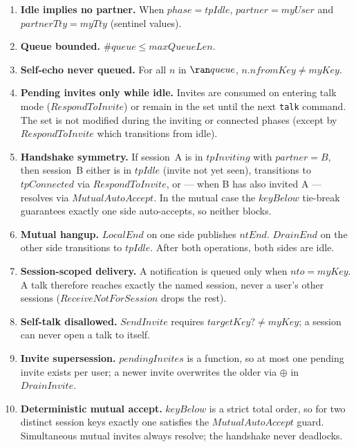 \documentclass[a4paper,10pt,fleqn]{article}
\begin{document}
\begin{enumerate}
\item \textbf{Idle implies no partner.}  When $phase = tpIdle$,
  $partner = myUser$ and $partnerTty = myTty$ (sentinel values).

\item \textbf{Queue bounded.}  $\# queue \leq maxQueueLen$.

\item \textbf{Self-echo never queued.}  For all $n$ in $\ran queue$,
  $n.nfromKey \neq myKey$.

\item \textbf{Pending invites only while idle.}  Invites are consumed
  on entering talk mode ($RespondToInvite$) or remain in the set
  until the next \texttt{talk} command.  The set is not modified
  during the inviting or connected phases (except by
  $RespondToInvite$ which transitions from idle).

\item \textbf{Handshake symmetry.}  If session~A is in $tpInviting$
  with $partner = B$, then session~B either is in $tpIdle$ (invite not
  yet seen), transitions to $tpConnected$ via $RespondToInvite$, or ---
  when B has also invited A --- resolves via $MutualAutoAccept$.  In the
  mutual case the $keyBelow$ tie-break guarantees exactly one side
  auto-accepts, so neither blocks.

\item \textbf{Mutual hangup.}  $LocalEnd$ on one side publishes
  $ntEnd$.  $DrainEnd$ on the other side transitions to $tpIdle$.
  After both operations, both sides are idle.

\item \textbf{Session-scoped delivery.}  A notification is queued only
  when $nto = myKey$.  A talk therefore reaches exactly the named
  session, never a user's other sessions ($ReceiveNotForSession$ drops
  the rest).

\item \textbf{Self-talk disallowed.}  $SendInvite$ requires
  $targetKey? \neq myKey$; a session can never open a talk to itself.

\item \textbf{Invite supersession.}  $pendingInvites$ is a function, so
  at most one pending invite exists per user; a newer invite overwrites
  the older via $\oplus$ in $DrainInvite$.

\item \textbf{Deterministic mutual accept.}  $keyBelow$ is a strict
  total order, so for two distinct session keys exactly one satisfies
  the $MutualAutoAccept$ guard.  Simultaneous mutual invites always
  resolve; the handshake never deadlocks.


\end{enumerate}
\end{document}
